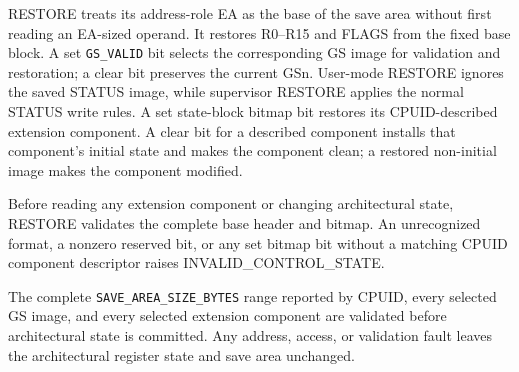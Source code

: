 RESTORE treats its address-role EA as the base of the save area without first reading an EA-sized operand. It restores R0--R15 and FLAGS from the fixed base block. A set \texttt{GS\_VALID} bit selects the corresponding GS image for validation and restoration; a clear bit preserves the current GSn. User-mode RESTORE ignores the saved STATUS image, while supervisor RESTORE applies the normal STATUS write rules. A set state-block bitmap bit restores its CPUID-described extension component. A clear bit for a described component installs that component's initial state and makes the component clean; a restored non-initial image makes the component modified.

Before reading any extension component or changing architectural state, RESTORE validates the complete base header and bitmap. An unrecognized format, a nonzero reserved bit, or any set bitmap bit without a matching CPUID component descriptor raises INVALID\_CONTROL\_STATE.

The complete \texttt{SAVE\_AREA\_SIZE\_BYTES} range reported by CPUID, every selected GS image, and every selected extension component are validated before architectural state is committed. Any address, access, or validation fault leaves the architectural register state and save area unchanged.
